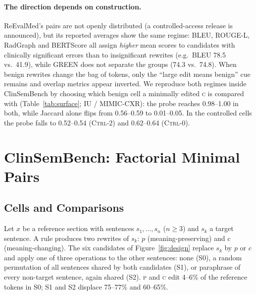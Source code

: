 \documentclass[11pt]{article}
\newcommand{\bench}{ClinSemBench\xspace}
\newcommand{\Pc}{\textsc{p}\xspace}
\newcommand{\Cc}{\textsc{c}\xspace}
\newcommand{\ctrlz}{\textsc{Ctrl-0}\xspace}
\newcommand{\ctrlt}{\textsc{Ctrl-2}\xspace}
\begin{document}
\paragraph{The direction depends on construction.}
ReEvalMed's pairs are not openly distributed (a controlled-access release is announced), but its reported averages show the same regime: BLEU, ROUGE-L, RadGraph and BERTScore all assign \emph{higher} mean scores to candidates with clinically significant errors than to insignificant rewrites (e.g.\ BLEU 78.5 vs.\ 41.9), while GREEN does not separate the groups (74.3 vs.\ 74.8).
When benign rewrites change the bag of tokens, only the ``large edit means benign'' cue remains and overlap metrics appear inverted.
We reproduce both regimes inside \bench by choosing which benign cell a minimally edited \Cc is compared with (Table~\ref{tab:surface}; IU / MIMIC-CXR): the probe reaches 0.98--1.00 in both, while Jaccard alone flips from 0.56--0.59 to 0.01--0.05.
In the controlled cells the probe falls to 0.52--0.54 (\ctrlt) and 0.62--0.64 (\ctrlz).

\begin{table}[t]
\centering
\scriptsize
\setlength{\tabcolsep}{2.5pt}
\begin{adjustbox}{max width=\columnwidth}

\end{adjustbox}
\caption{AUROC for predicting the meaning-changing label from surface statistics only. \emph{Surface-only}: cross-validated logistic regression on ten surface features. \emph{Jaccard}, \emph{\#Edit tok.}: single features. Values far from 0.5 in either direction mean the label leaks through surface form. Rows for \bench: IU X-Ray / MIMIC-CXR. $^{\dagger}$Original sentences recovered by alignment (Appendix~\ref{app:rate}).}
\label{tab:surface}
\end{table}

\section{\bench: Factorial Minimal Pairs}
\label{sec:design}

\subsection{Cells and Comparisons}

Let $x$ be a reference section with sentences $s_1,\dots,s_n$ ($n\ge3$) and $s_k$ a target sentence. A rule produces two rewrites of $s_k$: $p$ (meaning-preserving) and $c$ (meaning-changing). The six candidates of Figure~\ref{fig:design} replace $s_k$ by $p$ or $c$ and apply one of three operations to the other sentences: none (S0), a random permutation of all sentences shared by both candidates (S1), or paraphrase of every non-target sentence, again shared (S2). \Pc and \Cc edit 4--6\% of the reference tokens in S0; S1 and S2 displace 75--77\% and 60--65\%.
\end{document}
